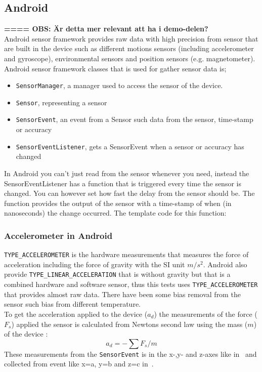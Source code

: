 \subsection{Android}\label{subsec:Android}
\textbf{==== OBS: Är detta mer relevant att ha i demo-delen?} \\
Android sensor framework provides raw data with high precision from sensor that are built in the device such as different motions sensors (including accelerometer and gyroscope), environmental sensors and position sensors (e.g. magnetometer). \cite[]{android:sensor}
Android sensor framework classes that is used for gather sensor data is; 
\begin{itemize}
	\item[] \texttt{SensorManager}, a manager used to access the sensor of the device. 
	\item[] \texttt{Sensor}, representing a sensor
	\item[] \texttt{SensorEvent}, an event from a Sensor such data from the sensor, time-stamp or accuracy
	\item[] \texttt{SensorEventListener}, gets a SensorEvent when a sensor or accuracy has changed 
\end{itemize}
In Android you can't just read from the sensor whenever you need, instead the SensorEventListener has a function that is triggered every time the sensor is changed. You can however set how fast the delay from the sensor should be. The function provides the output of the sensor with a time-stamp of when (in nanoseconds) the change occurred. The template code for this function:

\cite[]{android:sensorEvent} 




\subsubsection{Accelerometer in Android}\label{subsec:accAndroid}
\texttt{TYPE\_ACCELEROMETER} is the hardware measurements that measures the force of acceleration including the force of gravity with the SI unit $m/s^2$. Android also provide \texttt{TYPE\_LINEAR\_ACCELERATION} that is without gravity but that is a combined hardware and software sensor, thus this tests uses  \texttt{TYPE\_ACCELEROMETER} that provides almost raw data. There have been some bias removal from the sensor such bias from different temperature. \\
To get the acceleration applied to the device ($a_d$) the measurements of the force ($F_s$) applied the sensor is calculated from Newtons second law using the mass ($m$) of the device :
$$a_d=-\sum F_s / m $$ 
These measurements from the \texttt{SensorEvent} is in the x-,y- and z-axes like in~ and collected from event like x=a, y=b and z=c in~. \cite[]{android:sensorEvent}


